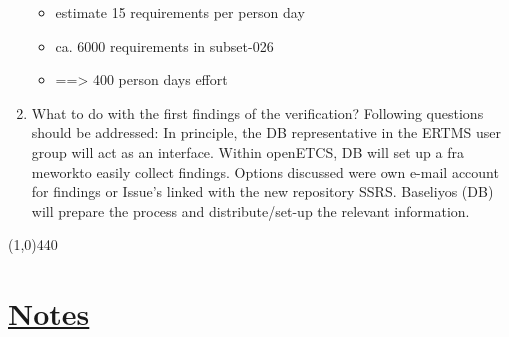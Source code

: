 \documentclass[a4paper]{article}
\begin{document}
\begin{enumerate}
\begin{itemize}
\item estimate 15 requirements per person day
\item ca. 6000 requirements in subset-026
\item ==> 400 person days effort
\end{itemize}

\item What to do with the first findings of the verification? Following questions should be addressed:
In principle, the DB representative in the ERTMS user group will act as an interface. Within openETCS, DB will set up a fra meworkto easily collect findings. Options discussed were own e-mail account for findings or Issue's linked with the new repository SSRS. Baseliyos (DB) will prepare the process and distribute/set-up the relevant information.

\end{enumerate}

\line(1,0){440}
\section*{\underline{Notes}}
\end{document}
